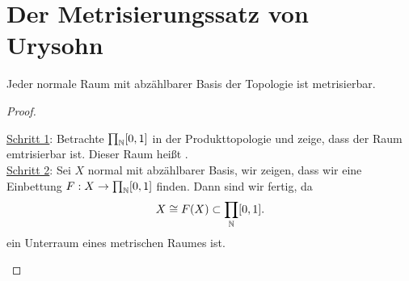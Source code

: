 \section{Der Metrisierungssatz von Urysohn}
\begin{theorem}\label{thm:metrisierungsssatz-von-urysohn}
    Jeder normale Raum mit abzählbarer Basis der Topologie ist metrisierbar.
\end{theorem}
\begin{proof}
    \begin{strategy}
        \underline{Schritt 1}: Betrachte $\prod_{\mathbb{N}} [0,1]$ in der Produkttopologie und zeige, dass der Raum emtrisierbar ist. Dieser Raum heißt .  \\
        \underline{Schritt 2}: Sei $X$ normal mit abzählbarer Basis, wir zeigen, dass wir eine Einbettung  $F : X \to  \prod_{\mathbb{N}} [0,1]$ finden.
        Dann sind wir fertig, da 
        \[
            X \cong F(X) \subset \prod_{\mathbb{N}}[0,1]
        .\] 
        ein Unterraum eines metrischen Raumes ist.
    \end{strategy}
\end{proof}
